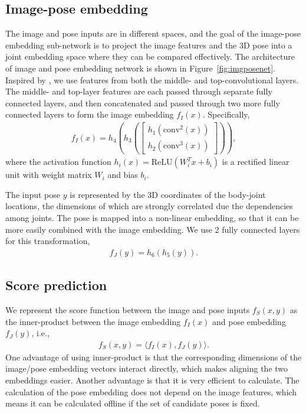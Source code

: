 \documentclass[10pt,twocolumn,letterpaper]{article}
\newcommand{\conv}{\mathrm{conv}}
\newcommand{\ReLU}{\mathrm{ReLU}}
\begin{document}
\subsection{Image-pose embedding}
\label{sub:imagepose}
\vspace{-0.05in}
The image and pose inputs are in different spaces, and
the goal of the image-pose embedding sub-network is to project the image features and the 3D pose into a joint embedding space where they can be compared effectively.
The architecture of image and pose embedding network is shown in Figure~\ref{fig:imgposenet}. 
%
Inspired by \cite{Sun2014dlface,hmlpeijcv}, we use features from both the middle- and top-convolutional layers.
%
%
%
The middle- and top-layer features are each passed through separate fully connected layers, and then concatenated and passed through two more fully connected layers to form the image embedding $f_{I}(x)$.
%
Specifically,
\begin{align} 
f_{I}(x) = h_4 ( h_3 ( \begin{bmatrix} h_1(\conv^{2}(x)) \\ h_2(\conv^{3}(x)) \end{bmatrix})),
\label{equ:imgfeature}
\end{align} 
where the activation function $h_i(x) = \ReLU( W_i^T x + b_i)$ is a rectified linear unit with  weight matrix $W_i$ and bias $b_i$.

The input pose $y$ is represented by the 3D coordinates of the body-joint locations, 
%
the dimensions of which are strongly correlated due the dependencies among joints. 
%
The pose is mapped into a non-linear embedding, so that it can be more easily combined with the image embedding.
%
%
We use 2 fully connected layers for this transformation,
\begin{align}
f_{J}(y) = h_6( h_5(y)).
\end{align}


 
%
 
\subsection{Score prediction}
%
%
We represent the score function between the image and pose inputs $f_{S}(x,y)$ as the inner-product between the image embedding $f_{I}(x)$ and pose embedding $f_{J}(y)$, i.e., 
\begin{align}
f_{S}(x,y)  = \langle f_{I}(x), f_{J}(y) \rangle.
\end{align} 
One advantage of using inner-product is that the corresponding dimensions of the image/pose embedding vectors interact directly, which makes aligning the two embeddings easier.
%
Another advantage %
is that it is very efficient to calculate.
%
The calculation of the pose embedding does not depend on the image features, which means it can be calculated offline if the set of candidate poses is fixed. 
\end{document}
